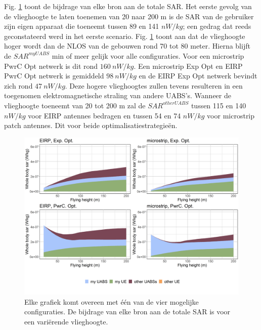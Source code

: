\documentclass[twocolumn]{phdsymp_dutch}
\begin{document}
Fig. \ref{fig:s3a_fourSourcesMatrix} toont de bijdrage van elke bron aan de totale \gls{SAR}.
Het eerste  gevolg van de vlieghoogte te laten toenemen van 20 naar 200 m is de 
  \gls{SAR}  van de gebruiker zijn eigen apparaat die toeneemt tussen 89 en 141 $nW/kg$;
een gedrag dat reeds geconstateerd werd in het eerste scenario.
Fig. \ref{fig:s3a_fourSourcesMatrix} toont aan dat de vlieghoogte hoger wordt dan de \gls{NLOS} van de gebouwen 
rond 70 tot 80 meter. Hierna blijft de $SAR^{myUABS}$ min of meer gelijk voor alle configuraties.
Voor een microstrip \gls{PwrC Opt} netwerk is dit rond  $160\ nW/kg$.
Een microstrip \gls{Exp Opt} en \gls{EIRP} \gls{PwrC Opt} netwerk is gemiddeld $98\ nW/kg$ en
de \gls{EIRP} \gls{Exp Opt} netwerk bevindt zich rond $47\ nW/kg$.
Deze hogere vlieghoogtes zullen tevens resulteren in een toegenomen elektromagnetische straling van andere
\gls{UABS}'s.
Wanneer de vlieghoogte toeneemt van 20 tot 200 m zal de $SAR^{otherUABS}$ tussen 115 en 140
$nW/kg$ voor \gls{EIRP} antennes bedragen en tussen 54 en 74 $nW/kg$ voor microstrip patch antennes.
Dit voor beide optimalisatiestrategie\"en.


\begin{figure}[h!]
  \includegraphics[width=\linewidth]{../results/s3/fhFourSources.png}
  \caption{Elke grafiek komt overeen met \'e\'en van de vier mogelijke configuraties.
   De bijdrage van elke bron aan de totale \acs{SAR} is voor een variërende vlieghoogte.}
  \label{fig:s3a_fourSourcesMatrix}
\end{figure}

\FloatBarrier
\end{document}

